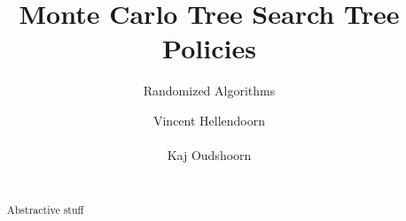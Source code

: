\documentclass{acm_proc_article-sp}
\begin{document}
\title{Monte Carlo Tree Search Tree Policies}
\subtitle{Randomized Algorithms}
%
%
%
%
%

%
\author{
%
%
\alignauthor
Vincent Hellendoorn \\
       \\
\alignauthor
Kaj Oudshoorn \\
       \\
}

\maketitle
\begin{abstract}
Abstractive stuff
\end{abstract}
\end{document}
